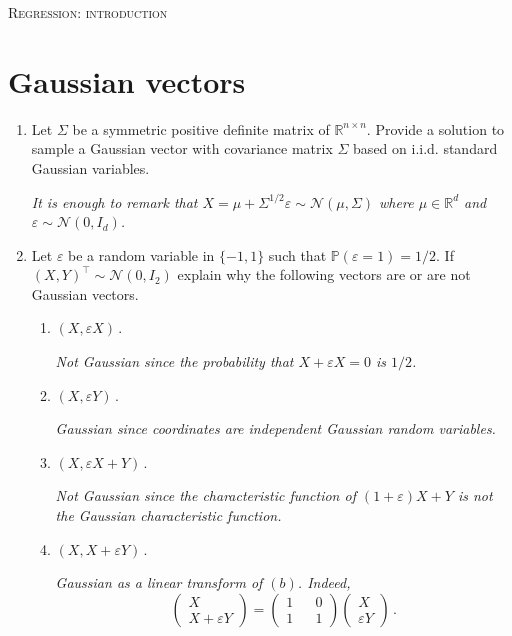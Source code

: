 \documentclass[a4paper,10pt,fleqn]{article}
\newcommand{\eqsp}{\,}
\newcommand{\rset}{\ensuremath{\mathbb{R}}}
\newcommand{\bP}{\mathbb{P}}
\newcommand{\X}{\ensuremath{\mathcal{X}}}
\newcommand{\1}{\ensuremath{\mathbbm{1}}}
\begin{document}

\noindent\hrulefill

\begin{center}
\textsc{Regression: introduction}
\end{center}
\hrulefill

\medskip


\section*{Gaussian vectors}
\begin{enumerate}
\item Let $\Sigma$ be a symmetric positive definite matrix of $\rset^{n\times n}$. Provide a solution to sample a Gaussian vector with covariance matrix $\Sigma$ based on i.i.d. standard Gaussian variables.

\vspace{.2cm}

{\em
It is enough to remark that $X = \mu +\Sigma^{1/2}\varepsilon \sim\mathcal{N}(\mu,\Sigma)$ where $\mu\in\rset^d$ and $\varepsilon \sim \mathcal{N}(0,I_d)$.
}

\item Let $\varepsilon$ be a random variable in $\{-1,1\}$ such that $\bP(\varepsilon = 1) = 1/2$. If $(X,Y)^\top\sim \mathcal{N}(0,I_2)$ explain why the following vectors are or are not Gaussian vectors.
\begin{enumerate}
\item $(X,\varepsilon X)$\eqsp.

{\em
Not Gaussian since the probability that  $X +\varepsilon X = 0$ is $1/2$.
}
\item $(X,\varepsilon Y)$\eqsp.

{\em
Gaussian since coordinates are independent Gaussian random variables.
}
\item $(X,\varepsilon X + Y)$\eqsp.

{\em
Not Gaussian since the characteristic function of $(1+\varepsilon) X + Y$ is not the Gaussian characteristic function.
}
\item $(X,X + \varepsilon Y)$\eqsp.

{\em
Gaussian as a linear transform of $(b)$. Indeed,
$$
\begin{pmatrix} X \\X + \varepsilon Y\end{pmatrix} = \begin{pmatrix} 1 && 0 \\1 && 1\end{pmatrix}\begin{pmatrix} X \\ \varepsilon Y\end{pmatrix}\eqsp.
$$
}
\end{enumerate}



\end{enumerate}
\end{document}
